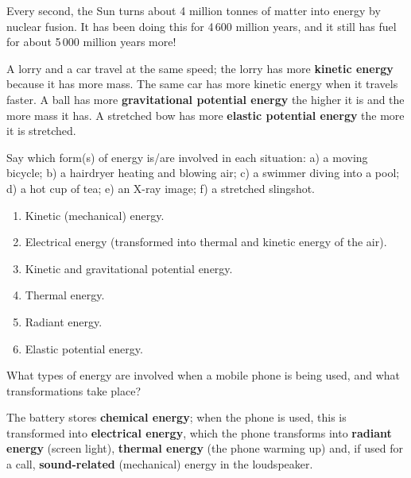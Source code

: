 \begin{didyouknow}
    Every second, the Sun turns about 4 million tonnes of matter into energy by nuclear fusion. It has been doing this for 4\,600 million years, and it still has fuel for about 5\,000 million years more!
\end{didyouknow}

\begin{example}
    A lorry and a car travel at the same speed; the lorry has more \textbf{kinetic energy} because it has more mass. The same car has more kinetic energy when it travels faster. A ball has more \textbf{gravitational potential energy} the higher it is and the more mass it has. A stretched bow has more \textbf{elastic potential energy} the more it is stretched.
\end{example}

\begin{exercise}
    Say which form(s) of energy is/are involved in each situation: a) a moving bicycle; b) a hairdryer heating and blowing air; c) a swimmer diving into a pool; d) a hot cup of tea; e) an X-ray image; f) a stretched slingshot.
    \begin{solu}
        \begin{enumerate}[label=\alph*)]
            \item Kinetic (mechanical) energy.
            \item Electrical energy (transformed into thermal and kinetic energy of the air).
            \item Kinetic and gravitational potential energy.
            \item Thermal energy.
            \item Radiant energy.
            \item Elastic potential energy.
        \end{enumerate}
    \end{solu}
\end{exercise}

\begin{exercise}
    What types of energy are involved when a mobile phone is being used, and what transformations take place?
    \begin{solu}
        The battery stores \textbf{chemical energy}; when the phone is used, this is transformed into \textbf{electrical energy}, which the phone transforms into \textbf{radiant energy} (screen light), \textbf{thermal energy} (the phone warming up) and, if used for a call, \textbf{sound-related} (mechanical) energy in the loudspeaker.
    \end{solu}
\end{exercise}

